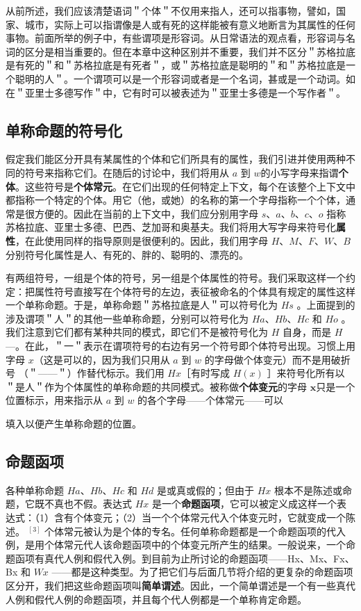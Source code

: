 从前所述，我们应该清楚语词＂个体＂不仅用来指人，还可以指事物，譬如，国家、城市，实际上可以指谓像是人或有死的这样能被有意义地断言为其属性的任何事物。前面所举的例子中，有些谓项是形容词。从日常语法的观点看，形容词与名词的区分是相当重要的。但在本章中这种区别并不重要，我们并不区分＂苏格拉底是有死的＂和＂苏格拉底是有死者＂，或＂苏格拉底是聪明的＂和＂苏格拉底是一个聪明的人＂。一个谓项可以是一个形容词或者是一个名词，甚或是一个动词。如在＂亚里士多德写作＂中，它有时可以被表述为＂亚里士多德是一个写作者＂。

\subsection{单称命题的符号化}

假定我们能区分开具有某属性的个体和它们所具有的属性，我们引进并使用两种不同的符号来指称它们。在随后的讨论中，我们将用从 $a$ 到 $w$的小写字母来指谓\textbf{个体}。这些符号是\textbf{个体常元}。在它们出现的任何特定上下文，每个在该整个上下文中都指称一个特定的个体。用它（他，或她）的名称的第一个字母指称一个个体，通常是很方便的。因此在当前的上下文中，我们应分别用字母 $s 、 a 、 b 、 c 、 o$ 指称苏格拉底、亚里士多德、巴西、芝加哥和奥基夫。我们将用大写字母来符号化\textbf{属性}，在此使用同样的指导原则是很便利的。因此，我们用字母 $H 、 M 、 F 、 W 、 B$ 分别符号化属性是人、有死的、胖的、聪明的、漂亮的。

有两组符号，一组是个体的符号，另一组是个体属性的符号。我们采取这样一个约定：把属性符号直接写在个体符号的左边，表征被命名的个体具有规定的属性这样一个单称命题。于是，单称命题＂苏格拉底是人＂可以符号化为 $H s$ 。上面提到的涉及谓项＂人＂的其他一些单称命题，分别可以符号化为 $H a 、 H b 、 H c$ 和 $H o$ 。我们注意到它们都有某种共同的模式，即它们不是被符号化为 $H$ 自身，而是 $H$ —。在此，＂一＂表示在谓项符号的右边有另一个符号即个体符号出现。习惯上用字母 $x$（这是可以的，因为我们只用从 $a$ 到 $w$ 的字母做个体变元）而不是用破折号 （＂——＂）作替代标示。我们用 $H x$［有时写成 $H(x)$ ］来符号化所有以 ＂是人＂作为个体属性的单称命题的共同模式。被称做\textbf{个体变元}的字母 $\boldsymbol{x}$只是一个位置标示，用来指示从 $a$ 到 $w$ 的各个字母——个体常元——可以

填入以便产生单称命题的位置。

\subsection{命题函项}

各种单称命题 $H a 、 H b 、 H c$ 和 $H d$ 是或真或假的；但由于 $H x$ 根本不是陈述或命题，它既不真也不假。表达式 $H x$ 是一个\textbf{命题函项}，它可以被定义成这样一个表达式：（1）含有个体变元；（2）当一个个体常元代入个体变元时，它就变成一个陈述。 ${ }^{[3]}$ 个体常元被认为是个体的专名。任何单称命题都是一个命题函项的代入例，是用个体常元代人该命题函项中的个体变元所产生的结果。一般说来，一个命题函项有真代人例和假代入例。到目前为止所讨论的命题函项——Hx、Mx、Fx、Bx 和 $W x$ ——都是这种类型。为了把它们与后面几节将介绍的更复杂的命题函项区分开，我们把这些命题函项叫\textbf{简单谓述}。因此，一个简单谓述是一个有一些真代人例和假代人例的命题函项，并且每个代人例都是一个单称肯定命题。 

